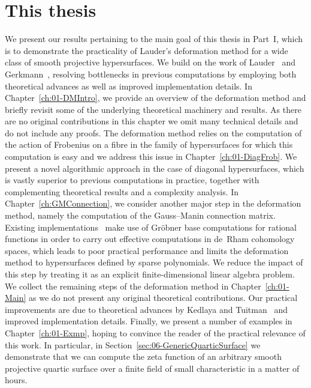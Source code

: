 \section{This thesis}

We present our results pertaining to the main goal of this thesis in 
Part~{I}, which is to demonstrate the practicality of Lauder's deformation 
method for a wide class of smooth projective hypersurfaces.  We build on 
the work of Lauder~\citep{Lau04a} and Gerkmann~\citep{Gerkmann2007}, 
resolving bottlenecks in previous computations by employing both theoretical 
advances as well as improved implementation details.  
In Chapter~\ref{ch:01-DMIntro}, we provide an overview of the deformation 
method and briefly revisit some of the underlying theoretical machinery 
and results.  As there are no original contributions in this chapter we 
omit many technical details and do not include any proofs.  
The deformation method relies on the computation of the action of 
Frobenius on a fibre in the family of hypersurfaces for which 
this computation is easy and we address this issue in 
Chapter~\ref{ch:01-DiagFrob}.  We present 
a novel algorithmic approach in the case of diagonal hypersurfaces, 
which is vastly superior to previous computations in practice, together 
with complementing theoretical results and a complexity analysis.
In Chapter~\ref{ch:GMConnection}, we consider another major step in the 
deformation method, namely the computation of the Gauss--Manin connection 
matrix.  Existing implementations~\citep{Lau04a,Gerkmann2007,Kedlaya2011} 
make use of Gr\"obner base computations for rational functions in order 
to carry out effective computations in de~Rham cohomology spaces, which 
leads to poor practical performance and limits the deformation method to 
hypersurfaces defined by sparse polynomials.  We reduce the impact 
of this step by treating it as an explicit finite-dimensional linear 
algebra problem.  We collect the remaining steps of the deformation 
method in Chapter~\ref{ch:01-Main}  as we do not present any original 
theoretical contributions.  Our practical improvements are due to 
theoretical advances by Kedlaya and Tuitman~\citep{KedlayaTuitman2012} 
and improved implementation details.  Finally, we present a number of 
examples in Chapter~\ref{ch:01-Exmp}, hoping to convince the reader of 
the practical relevance of this work.  In particular, in 
Section~\ref{sec:06-GenericQuarticSurface} we demonstrate that we can 
compute the zeta function of an arbitrary smooth projective quartic 
surface over a finite field of small characteristic in a matter of hours.

